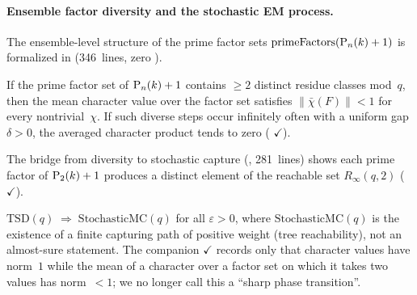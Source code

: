 \paragraph{Ensemble factor diversity and the stochastic EM process.}
The ensemble-level structure of the prime factor sets
$\text{primeFactors}(\mathrm{P}_{n}(k)+1)$ is formalized in
 (346~lines, zero ).

\begin{theorem}
\label{thm:factor-diversity-contraction}
If the prime factor set of $\mathrm{P}_{n}(k)+1$ contains $\geq 2$ distinct
residue classes mod~$q$, then the mean character value over the factor
set satisfies $\|\bar\chi(F)\| < 1$ for every nontrivial~$\chi$.
If such diverse steps occur infinitely often with a uniform gap
$\delta > 0$, the averaged character product tends to zero
(
{\color{leanink}$\checkmark$}).
\end{theorem}

\noindent
The bridge from diversity to stochastic capture
(, 281~lines) shows each
prime factor of $\mathrm{P}_{2}(k)+1$ produces a distinct element of the
reachable set $R_\infty(q, 2)$
(
{\color{leanink}$\checkmark$}).

\begin{theorem}
\label{thm:integer-stochastic-mc}
$\mathrm{TSD}(q) \;\Longrightarrow\; \mathrm{StochasticMC}(q)$ for all
$\varepsilon > 0$, where $\mathrm{StochasticMC}(q)$ is the existence of a
finite capturing path of positive weight (tree reachability), not an
almost-sure statement.  The companion
{\color{leanink}$\checkmark$} records only that character values have
norm~$1$ while the mean of a character over a factor set on which it
takes two values has norm~$<1$; we no longer call this a ``sharp phase
transition''.
\end{theorem}

